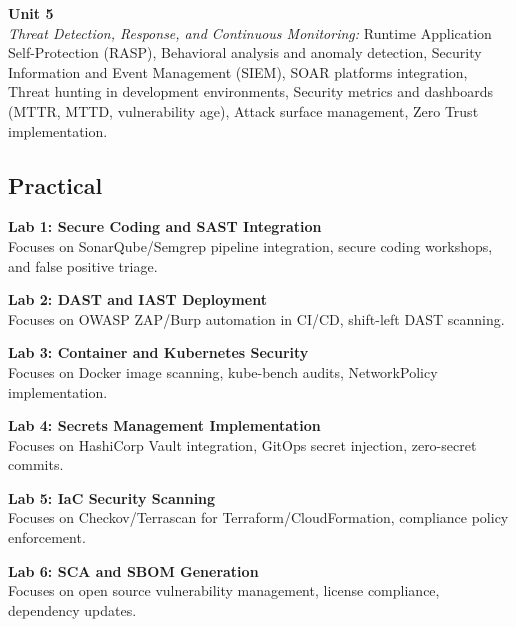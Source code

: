 \vspace{0.3cm}

\noindent\textbf{Unit 5} \\
\textit{Threat Detection, Response, and Continuous Monitoring:} Runtime Application Self-Protection (RASP), Behavioral analysis and anomaly detection, Security Information and Event Management (SIEM), SOAR platforms integration, Threat hunting in development environments, Security metrics and dashboards (MTTR, MTTD, vulnerability age), Attack surface management, Zero Trust implementation.

\newpage

\subsection*{Practical}
\noindent\textbf{Lab 1: Secure Coding and SAST Integration} \\
Focuses on SonarQube/Semgrep pipeline integration, secure coding workshops, and false positive triage.

\vspace{0.2cm}

\noindent\textbf{Lab 2: DAST and IAST Deployment} \\
Focuses on OWASP ZAP/Burp automation in CI/CD, shift-left DAST scanning.

\vspace{0.2cm}

\noindent\textbf{Lab 3: Container and Kubernetes Security} \\
Focuses on Docker image scanning, kube-bench audits, NetworkPolicy implementation.

\vspace{0.2cm}

\noindent\textbf{Lab 4: Secrets Management Implementation} \\
Focuses on HashiCorp Vault integration, GitOps secret injection, zero-secret commits.

\vspace{0.2cm}

\noindent\textbf{Lab 5: IaC Security Scanning} \\
Focuses on Checkov/Terrascan for Terraform/CloudFormation, compliance policy enforcement.

\vspace{0.2cm}

\noindent\textbf{Lab 6: SCA and SBOM Generation} \\
Focuses on open source vulnerability management, license compliance, dependency updates.

